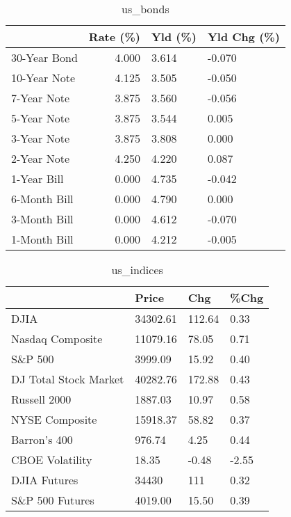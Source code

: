 \documentclass{article}%
\begin{document}
%


\begin{table}[htbp]%
\caption{us\_bonds}%
\centering%
\begin{adjustbox}{width=1\textwidth}%
\begin{tabular}{lrll}
\toprule
             &  Rate (\%) & Yld (\%) & Yld Chg (\%) \\
\midrule
30-Year Bond &     4.000 &   3.614 &      -0.070 \\
10-Year Note &     4.125 &   3.505 &      -0.050 \\
 7-Year Note &     3.875 &   3.560 &      -0.056 \\
 5-Year Note &     3.875 &   3.544 &       0.005 \\
 3-Year Note &     3.875 &   3.808 &       0.000 \\
 2-Year Note &     4.250 &   4.220 &       0.087 \\
 1-Year Bill &     0.000 &   4.735 &      -0.042 \\
6-Month Bill &     0.000 &   4.790 &       0.000 \\
3-Month Bill &     0.000 &   4.612 &      -0.070 \\
1-Month Bill &     0.000 &   4.212 &      -0.005 \\
\bottomrule
\end{tabular}
%
\end{adjustbox}%
\end{table}

%


\begin{table}[htbp]%
\caption{us\_indices}%
\centering%
\begin{adjustbox}{width=1\textwidth}%
\begin{tabular}{llll}
\toprule
                      &    Price &    Chg &  \%Chg \\
\midrule
                 DJIA & 34302.61 & 112.64 &  0.33 \\
     Nasdaq Composite & 11079.16 &  78.05 &  0.71 \\
              S\&P 500 &  3999.09 &  15.92 &  0.40 \\
DJ Total Stock Market & 40282.76 & 172.88 &  0.43 \\
         Russell 2000 &  1887.03 &  10.97 &  0.58 \\
       NYSE Composite & 15918.37 &  58.82 &  0.37 \\
         Barron's 400 &   976.74 &   4.25 &  0.44 \\
      CBOE Volatility &    18.35 &  -0.48 & -2.55 \\
         DJIA Futures &    34430 &    111 &  0.32 \\
      S\&P 500 Futures &  4019.00 &  15.50 &  0.39 \\
\bottomrule
\end{tabular}
%
\end{adjustbox}%
\end{table}
\end{document}
